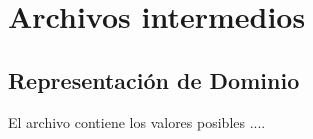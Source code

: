 \chapter{Archivos intermedios}

\section {Representación de Dominio}

\label{archivos_intermedios:dom}
El archivo contiene los valores posibles ....
